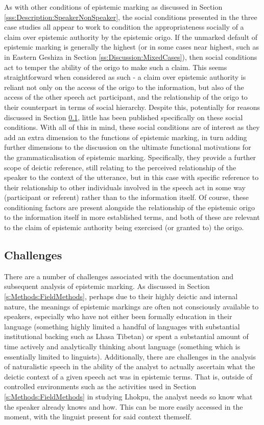 As with other conditions of epistemic marking as discussed in Section \ref{sss:Description:SpeakerNonSpeaker}, the social conditions presented in the three case studies all appear to work to condition the appropriateness socially of a claim over epistemic authority by the epistemic origo. If the unmarked default of epistemic marking is generally the highest (or in some cases near highest, such as in Eastern Geshiza in Section \ref{ss:Discussion:MixedCases}), then social conditions act to temper the ability of the origo to make such a claim. This seems straightforward when considered as such - a claim over epistemic authority is reliant not only on the access of the origo to the information, but also of the access of the other speech act participant, and the relationship of the origo to their counterpart in terms of social hierarchy. Despite this, potentially for reasons discussed in Section \ref{ss:Discussion:SocialChallenges}, little has been published specifically on these social conditions. With all of this in mind, these social conditions are of interest as they add an extra dimension to the functions of epistemic marking, in turn adding further dimensions to the discussion on the ultimate functional motivations for the grammaticalisation of epistemic marking. Specifically, they provide a further scope of deictic reference, still relating to the perceived relationship of the speaker to the context of the utterance, but in this case with specific reference to their relationship to other individuals involved in the speech act in some way (participant or referent) rather than to the information itself. Of course, these conditioning factors are present alongside the relationship of the epistemic origo to the information itself in more established terms, and both of these are relevant to the claim of epistemic authority being exercised (or granted to) the origo.

\subsection{Challenges}\label{ss:Discussion:SocialChallenges}
There are a number of challenges associated with the documentation and subsequent analysis of epistemic marking. As discussed in Section \ref{s:Methods:FieldMethods}, perhaps due to their highly deictic and internal nature, the meanings of epistemic markings are often not consciously available to speakers, especially who have not either been formally education in their language (something highly limited a handful of languages with substantial institutional backing such as Lhasa Tibetan) or spent a substantial amount of time actively and analytically thinking about language (something which is essentially limited to linguists). Additionally, there are challenges in the analysis of naturalistic speech in the ability of the analyst to actually ascertain what the deictic context of a given speech act was in epistemic terms. That is, outside of controlled environments such as the activities used in Section \ref{s:Methods:FieldMethods} in studying Lhokpu, the analyst needs so know what the speaker already knows and how. This can be more easily accessed in the moment, with the linguist present for said context themself.

